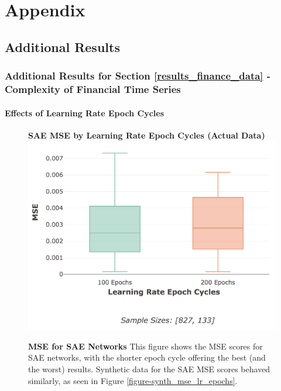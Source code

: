 \documentclass[a4paper,11pt,oneside]{article}
\theoremstyle{plain}
\theoremstyle{definition}
\begin{document}
	\newpage
	\section{Appendix}\label{Appendix}
	
	\subsection{Additional Results}
	
	\subsubsection{Additional Results for Section \ref{results_finance_data} - Complexity of Financial Time Series}\label{results_appendix_finance_data}
	
	\paragraph{Effects of Learning Rate Epoch Cycles}
	
		\begin{figure}[H]
		\centering 
		\textbf{SAE MSE by Learning Rate Epoch Cycles (Actual Data)}
		\includegraphics[scale=0.3]{images/results/network/lr/actual_mse_lr_epochs.png}
		\caption[SAE MSE by Learning Rate Epoch Cycles (Actual Data)]{\textbf{MSE for SAE Networks} 
			\newline This figure shows the MSE scores for SAE networks, with the shorter epoch cycle offering the best (and the worst) results. Synthetic data for the SAE MSE scores behaved similarly, as seen in Figure \ref{figure-synth_mse_lr_epochs}.}
		\label{figure-actual_mse_lr_epochs}
	\end{figure}%
	
\end{document}
